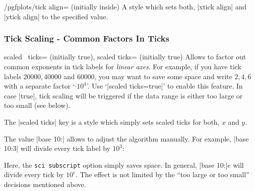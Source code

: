 \begin{stylekey}{/pgfplots/tick align= (initially inside)}
	A style which sets both, |xtick align| and |ytick align| to the specified value.
\end{stylekey}

\subsubsection{Tick Scaling - Common Factors In Ticks}
\label{sec:scaled:ticks}%
\begin{pgfplotsxykeylist}{
	scaled \x\ ticks= (initially true),
	scaled ticks= (initially true)}
Allows to factor out common exponents in tick labels for \emph{linear axes}. For example, if you have tick labels $20000,40000$ and $60000$, you may want to save some space and write $2,4,6$ with a separate factor `$\cdot 10^4$'. Use `|scaled ticks=true|' to enable this feature. In case |true|, tick scaling will be triggered if the data range is either too large or too small (see below).
\begin{codeexample}[]
%
\end{codeexample}

\begin{codeexample}[]
\end{codeexample}

	The |scaled ticks| key is a style which simply sets scaled ticks for both, $x$ and $y$.

	The value |base 10:| allows to adjust the algorithm manually. For example, |base 10:3| will divide every tick label by $10^3$:
\begin{codeexample}[]
\end{codeexample}
\noindent Here, the \texttt{sci subscript} option simply saves space.
In general, |base 10:|$e$ will divide every tick by $10^e$. The effect
is not limited by the ``too large or too small'' decisions mentioned
above.


\end{pgfplotsxykeylist}
